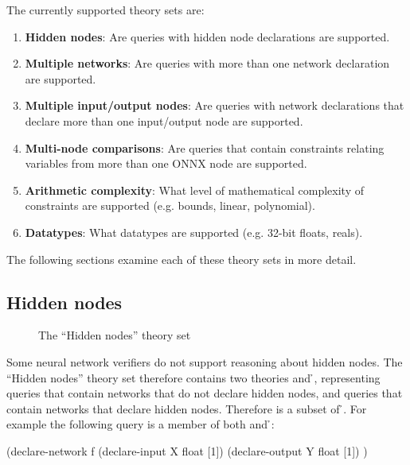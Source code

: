The currently supported theory sets are:
\begin{enumerate}
\item \textbf{Hidden nodes}: Are queries with hidden node declarations  are supported.
\item \textbf{Multiple networks}: Are queries with more than one network declaration are supported.
\item \textbf{Multiple input/output nodes}: Are queries with network declarations that declare more than one input/output node  are supported.
\item \textbf{Multi-node comparisons}: Are queries that contain constraints relating variables from more than one ONNX node are supported.
\item \textbf{Arithmetic complexity}: What level of mathematical complexity of constraints are supported (e.g. bounds, linear, polynomial). 
\item \textbf{Datatypes}: What datatypes are supported (e.g. 32-bit floats, reals).
\end{enumerate}
The following sections examine each of these theory sets in more detail.

\subsection{Hidden nodes}
\label{sec:hidden-nodes}

\begin{figure}[h]
\centering
{}
\caption{The ``Hidden nodes'' theory set}
\label{fig:hidden-nodes-theory-set}
\end{figure}

Some neural network verifiers do not support reasoning about hidden nodes. The ``Hidden nodes'' theory set therefore contains two theories \nh{} and \h{}, representing queries that contain networks that do not declare hidden nodes, and queries that contain networks that declare hidden nodes. Therefore \nh{} is a subset of \h{}. For example the following query is a member of both \nh{} and \h{}:

\begin{code}[style=lbnf]
(declare-network f
    (declare-input  X float [1])
    (declare-output Y float [1])
)
\end{code}


